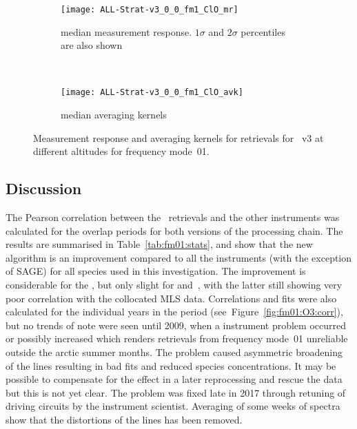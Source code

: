 \begin{figure}[tbhp]
    \centering
    \begin{subfigure}[b]{0.49\textwidth}
        \texttt{[image: ALL-Strat-v3\_0\_0\_fm1\_ClO\_mr]}
        \caption{median measurement response.  $1\sigma$ and $2\sigma$
        percentiles are also shown}
        \label{fig:fm01:ClO:mr}
    \end{subfigure}
    \,
    \begin{subfigure}[b]{0.49\textwidth}
        \texttt{[image: ALL-Strat-v3\_0\_0\_fm1\_ClO\_avk]}
        \caption{median averaging kernels\newline~}
        \label{fig:fm01:ClO:avk}
    \end{subfigure}
    \caption{Measurement response and averaging kernels for 
    retrievals for \smr~v3 at different altitudes for frequency mode~01.}
    \label{fig:fm01:ClO:mr_avk}
\end{figure}

\newpage
\subsection{Discussion}
\label{sec:fm01:discussion}
The Pearson correlation between the \smr\ retrievals and the other instruments
was calculated for the overlap periods for both versions of the processing
chain.  The results are summarised in Table~\ref{tab:fm01:stats}, and show that
the new algorithm is an improvement compared to all the instruments (with the
exception of SAGE) for all species used in this investigation. The improvement
is considerable for the , but only slight for 
and~, with the latter still showing very poor correlation with the
collocated MLS data. Correlations and fits were also calculated for the
individual years in the period (see~Figure~\ref{fig:fm01:O3:corr}), but no
trends of note were seen until 2009, when a instrument problem occurred or
possibly increased which renders retrievals from frequency mode~01 unreliable
outside the arctic summer months.  The problem caused asymmetric broadening of
the lines resulting in bad fits and reduced species concentrations. It may be
possible to compensate for the effect in a later reprocessing and rescue the
data but this is not yet clear. The problem was fixed late in 2017 through
retuning of driving circuits by the instrument scientist.  Averaging of some
weeks of spectra show that the distortions of the lines has been removed.


